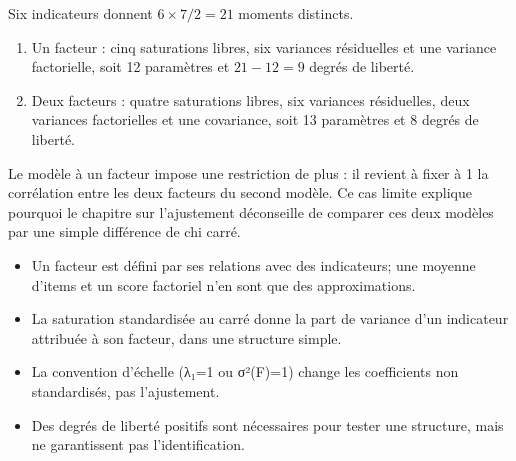 \documentclass[
  french,
  11pt,
  a4paper,
  DIV=11,
  numbers=noendperiod]{scrreprt}
\providecommand{\tightlist}{%
  \setlength{\itemsep}{0pt}\setlength{\parskip}{0pt}}
\begin{document}
\begin{tcolorbox}[enhanced jigsaw, arc=.35mm, bottomrule=.15mm, bottomtitle=1mm, breakable, colback=white, colbacktitle=quarto-callout-tip-color!10!white, colframe=quarto-callout-tip-color-frame, coltitle=black, left=2mm, leftrule=.75mm, opacityback=0, opacitybacktitle=0.6, rightrule=.15mm, title={Réponse}, titlerule=0mm, toprule=.15mm, toptitle=1mm]

Six indicateurs donnent \(6\times7/2=21\) moments distincts.

\begin{enumerate}
\def\labelenumi{\arabic{enumi}.}
\tightlist
\item
  Un facteur : cinq saturations libres, six variances résiduelles et une
  variance factorielle, soit 12 paramètres et \(21-12=9\) degrés de
  liberté.
\item
  Deux facteurs : quatre saturations libres, six variances résiduelles,
  deux variances factorielles et une covariance, soit 13 paramètres et 8
  degrés de liberté.
\end{enumerate}

Le modèle à un facteur impose une restriction de plus : il revient à
fixer à 1 la corrélation entre les deux facteurs du second modèle. Ce
cas limite explique pourquoi le chapitre sur l'ajustement déconseille de
comparer ces deux modèles par une simple différence de chi carré.

\end{tcolorbox}

\begin{tcolorbox}[enhanced jigsaw, arc=.35mm, bottomrule=.15mm, bottomtitle=1mm, breakable, colback=white, colbacktitle=quarto-callout-important-color!10!white, colframe=quarto-callout-important-color-frame, coltitle=black, left=2mm, leftrule=.75mm, opacityback=0, opacitybacktitle=0.6, rightrule=.15mm, title={À retenir}, titlerule=0mm, toprule=.15mm, toptitle=1mm]

\begin{itemize}
\tightlist
\item
  Un facteur est défini par ses relations avec des indicateurs; une
  moyenne d'items et un score factoriel n'en sont que des
  approximations.
\item
  La saturation standardisée au carré donne la part de variance d'un
  indicateur attribuée à son facteur, dans une structure simple.
\item
  La convention d'échelle (λ₁=1 ou σ²(F)=1) change les coefficients non
  standardisés, pas l'ajustement.
\item
  Des degrés de liberté positifs sont nécessaires pour tester une
  structure, mais ne garantissent pas l'identification.
\end{itemize}

\end{tcolorbox}
\end{document}
